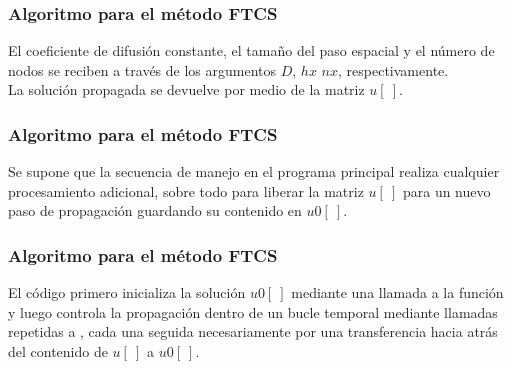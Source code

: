 \begin{frame}
\frametitle{Algoritmo para el método FTCS}
El coeficiente de difusión constante, el tamaño del paso espacial y el número de nodos se reciben a través de los argumentos $D$, $hx$ $nx$, respectivamente.
\\
La solución propagada se devuelve por medio de la matriz $u[ \ ]$.
\end{frame}
\begin{frame}
\frametitle{Algoritmo para el método FTCS}
Se supone que la secuencia de manejo en el programa principal realiza cualquier procesamiento adicional, sobre todo para liberar la matriz $u[ \ ]$ para un nuevo paso de propagación guardando su contenido en $u0[ \ ]$.
\end{frame}
\begin{frame}
\frametitle{Algoritmo para el método FTCS}
El código primero inicializa la solución $u0[ \ ]$ mediante una llamada a la función  y luego controla la propagación dentro de un bucle temporal mediante llamadas repetidas a , cada una seguida necesariamente por una transferencia hacia atrás del contenido de $u[ \ ]$ a $u0[ \ ]$.    
\end{frame}
